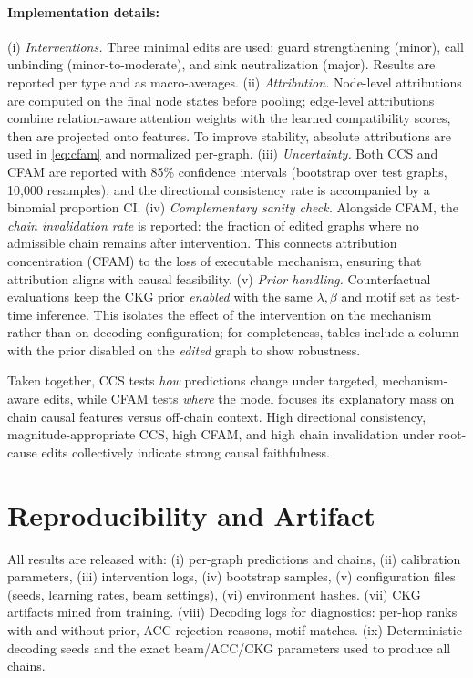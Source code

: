 \documentclass{buthesis}
\begin{document}
\paragraph{Implementation details:}
(i) \emph{Interventions.} Three minimal edits are used: guard strengthening (minor), call unbinding (minor-to-moderate), and sink neutralization (major). Results are reported per type and as macro-averages.  
(ii) \emph{Attribution.} Node-level attributions are computed on the final node states before pooling; edge-level attributions combine relation-aware attention weights with the learned compatibility scores, then are projected onto features. To improve stability, absolute attributions are used in \eqref{eq:cfam} and normalized per-graph.  
(iii) \emph{Uncertainty.} Both CCS and CFAM are reported with 85\% confidence intervals (bootstrap over test graphs, 10{,}000 resamples), and the directional consistency rate is accompanied by a binomial proportion CI.  
(iv) \emph{Complementary sanity check.} Alongside CFAM, the \emph{chain invalidation rate} is reported: the fraction of edited graphs where no admissible chain remains after intervention. This connects attribution concentration (CFAM) to the loss of executable mechanism, ensuring that attribution aligns with causal feasibility.
(v) \emph{Prior handling.} Counterfactual evaluations keep the CKG prior \emph{enabled} with the same $\lambda,\beta$ and motif set as test-time inference. This isolates the effect of the intervention on the mechanism rather than on decoding configuration; for completeness, tables include a column with the prior disabled on the \emph{edited} graph to show robustness.


\noindent Taken together, CCS tests \emph{how} predictions change under targeted, mechanism-aware edits, while CFAM tests \emph{where} the model focuses its explanatory mass on chain causal features versus off-chain context. High directional consistency, magnitude-appropriate CCS, high CFAM, and high chain invalidation under root-cause edits collectively indicate strong causal faithfulness.

\section{Reproducibility and Artifact}
\label{sec:eval-artifact}

All results are released with:
(i) per-graph predictions and chains,
(ii) calibration parameters,
(iii) intervention logs,
(iv) bootstrap samples,
(v) configuration files (seeds, learning rates, beam settings),
(vi) environment hashes.
(vii) CKG artifacts mined from training.
(viii) Decoding logs for diagnostics: per-hop ranks with and without prior, ACC rejection reasons, motif matches.
(ix) Deterministic decoding seeds and the exact beam/ACC/CKG parameters used to produce all chains.
\end{document}
